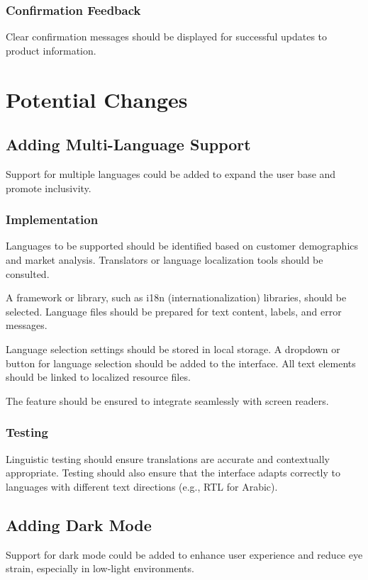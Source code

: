 \documentclass[a4paper,journal]{IEEEtran}
\begin{document}
\subsubsection{Confirmation Feedback}
Clear confirmation messages should be displayed for successful updates to
product information.

\section{Potential Changes}
\subsection{Adding Multi-Language Support}
Support for multiple languages could be added to expand the user base and
promote inclusivity.

\subsubsection{Implementation}
Languages to be supported should be identified based on customer demographics
and market analysis. Translators or language localization tools should be
consulted.

A framework or library, such as i18n (internationalization) libraries, should
be selected. Language files should be prepared for text content,
labels, and error messages.

Language selection settings should be stored in local storage.
A dropdown or button for language selection should be added to the interface.
All text elements should be linked to localized resource files.

The feature should be ensured to
integrate seamlessly with screen readers.

\subsubsection{Testing}
Linguistic testing should ensure translations are accurate and contextually
appropriate.
Testing should also ensure that the interface adapts correctly to languages
with different text directions (e.g., RTL for Arabic).

\subsection{Adding Dark Mode}
Support for dark mode could be added to enhance user experience and reduce eye
strain, especially in low-light environments.
\end{document}
